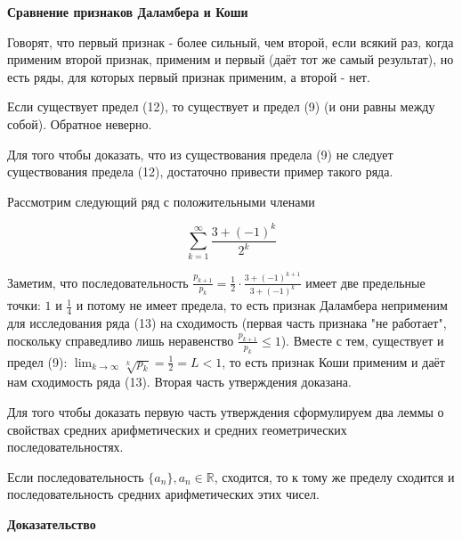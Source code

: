 \textbf{Сравнение признаков Даламбера и Коши}

\begin{definition}
	Говорят,  что первый признак - более сильный, чем второй, если всякий раз, когда применим второй признак, применим и первый (даёт тот же самый результат), но есть ряды, для которых первый признак применим, а второй - нет.
\end{definition}

\begin{statm}
	Если существует предел (12), то существует и предел (9) (и они равны между собой). Обратное неверно.
\end{statm}

Для того чтобы доказать, что из существования предела (9) не следует существования предела (12), достаточно привести пример такого ряда.

Рассмотрим следующий ряд с положительными членами

\begin{equation}
	\displaystyle\sum_{k = 1}^\infty \frac{3 + (-1)^k}{2^k}
\end{equation}

Заметим, что последовательность {\small $\frac{p_{k + 1}}{p_k} = \frac{1}{2} \cdot \frac{3 + (-1)^{k + 1}}{3 + (-1)^k}$} имеет две предельные точки: $1$ и $\frac{1}{4}$ и потому не имеет предела, то есть признак Даламбера неприменим для исследования ряда (13) на сходимость (первая часть признака "не работает", поскольку справедливо лишь неравенство {\small $\frac{p_{k + 1}}{p_k} \leqslant 1$}). Вместе с тем, существует и предел (9): $\displaystyle\lim_{k \rightarrow \infty} \sqrt[k]{p_k} = \frac{1}{2} = L < 1$, то есть признак Коши применим и даёт нам сходимость ряда (13). Вторая часть утверждения доказана.

Для того чтобы доказать первую часть утверждения сформулируем два леммы о свойствах средних арифметических и средних геометрических последовательностях.

\begin{lemm}
	Если последовательность $\{a_n\}, a_n \in \mathbb{R}$, сходится, то к тому же пределу сходится и последовательность средних арифметических этих чисел.
\end{lemm}

\textbf{Доказательство}

